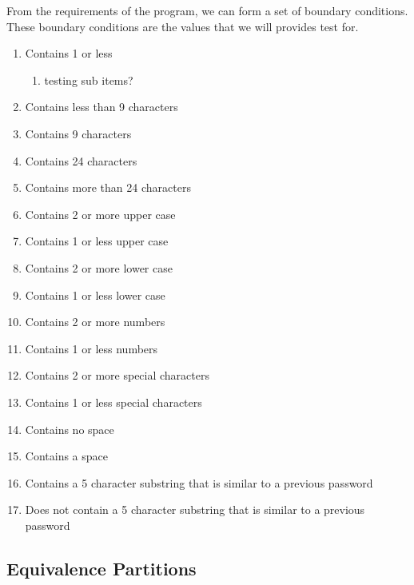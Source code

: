 \documentclass[12pt,letterpaper]{article}
\begin{document}
From the requirements of the program, we can form a set of boundary conditions. These
boundary conditions are the values that we will provides test for.

\begin{enumerate}
\item Contains 1 or less
\begin{enumerate}
\item testing sub items?
\end{enumerate}
\item Contains less than 9 characters
\item Contains 9 characters
\item Contains 24 characters
\item Contains more than 24 characters
\item Contains 2 or more upper case
\item Contains 1 or less upper case
\item Contains 2 or more lower case
\item Contains 1 or less lower case
\item Contains 2 or more numbers
\item Contains 1 or less numbers
\item Contains 2 or more special characters
\item Contains 1 or less special characters
\item Contains no space
\item Contains a space
\item Contains a 5 character substring that is similar to a previous password
\item Does not contain a 5 character substring that is similar to a previous password
\end{enumerate}




\subsection{Equivalence Partitions}
\end{document}

